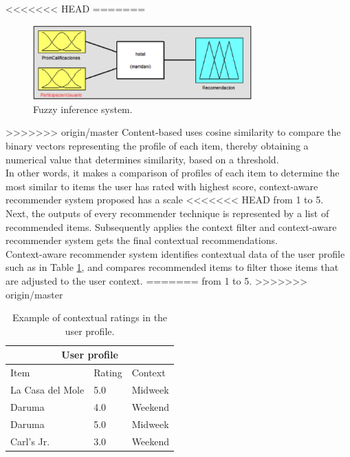 <<<<<<< HEAD
=======
\begin{figure}
\captionsetup{justification=centering,margin=2cm,font=footnotesize}
\centering
\setlength\fboxsep{0pt}
\setlength\fboxrule{0.7pt}
\includegraphics[width=0.75\textwidth]{img/fis.png}
\caption{Fuzzy inference system.}
\label{fig:fis}   
\end{figure}
>>>>>>> origin/master
Content-based uses cosine similarity to compare the binary
vectors representing the profile of each item, thereby obtaining a
numerical value that determines similarity, based on a threshold. \\   
In other words, it makes a comparison of profiles of each item to
determine the most similar to items the user has rated with highest
score, context-aware recommender system proposed has a scale 
<<<<<<< HEAD
from 1 to 5. \\
Next, the outputs of every recommender technique is represented by a
list of recommended items. Subsequently applies the context filter and
context-aware recommender system gets the final contextual
recommendations.\\  Context-aware recommender system identifies
contextual data of the user profile such as in Table  \ref{tab:2}, and
compares recommended items to filter those items that are adjusted to
the user context.  
=======
from 1 to 5. 
>>>>>>> origin/master
\begin{table}[htb]
\small
\centering
\captionsetup{font=footnotesize}
\caption{Example of contextual ratings in the user profile.}
\label{tab:2}
\small
\begin{tabular}{lll}
\hline
\multicolumn{3}{c}{\textbf{User profile}} \\ \hline
Item & Rating & Context \\ \hline
La Casa del Mole & 5.0 & Midweek \\ 
Daruma           & 4.0 & Weekend \\ 
Daruma           & 5.0 & Midweek \\ 
Carl's Jr.       & 3.0 & Weekend \\ \hline
\end{tabular}
\end{table}
